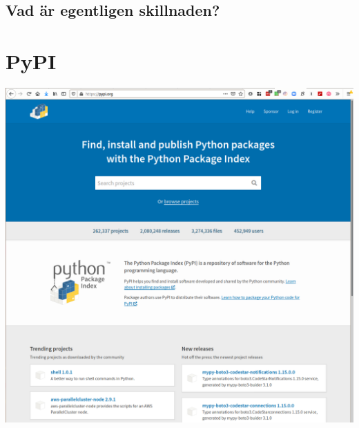 \subsection{Vad är egentligen skillnaden?}

\begin{frame}[fragile]
  \begin{example}
    
  \end{example}
\end{frame}

\begin{frame}[fragile]
  \begin{example}
    
  \end{example}
\end{frame}


\section{PyPI}

\begin{frame}
  \includegraphics[width=\columnwidth]{figs/pypi.png}
\end{frame}

